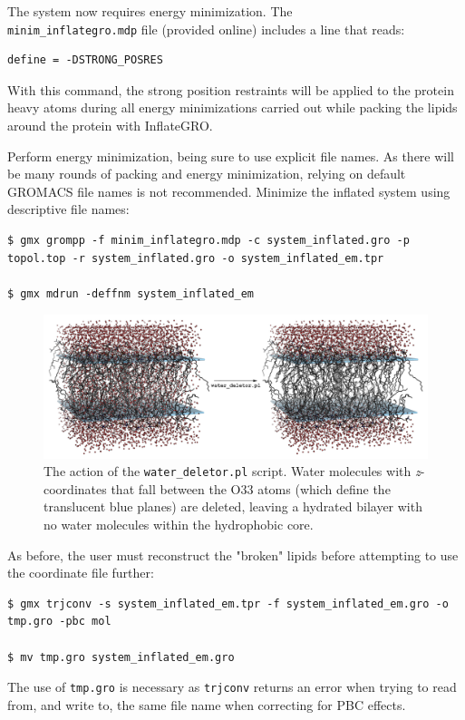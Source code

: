 \documentclass[9pt,tutorial,pubversion]{livecoms}
\begin{document}
The system now requires energy minimization. The\\ \texttt{minim\_inflategro.mdp} file (provided online) includes a line that reads:

\begin{lstlisting}
define = -DSTRONG_POSRES
\end{lstlisting}
%
With this command, the strong position restraints will be applied to the protein heavy atoms during all energy minimizations carried out while packing the lipids around the protein with InflateGRO.

Perform energy minimization, being sure to use explicit file names. As there will be many rounds of packing and energy minimization, relying on default GROMACS file names is not recommended. Minimize the inflated system using descriptive file names:

\begin{lstlisting}
$ gmx grompp -f minim_inflategro.mdp -c system_inflated.gro -p topol.top -r system_inflated.gro -o system_inflated_em.tpr

$ gmx mdrun -deffnm system_inflated_em
\end{lstlisting}

\begin{figure}[h!]
\centering
\includegraphics{kalp_dppc_water_deletor}
\caption{The action of the \texttt{water\_deletor.pl} script. Water molecules with {\em z}-coordinates that fall between the O33 atoms (which define the translucent blue planes) are deleted, leaving a hydrated bilayer with no water molecules within the hydrophobic core.}
\label{kalp_lipid_water_delete}
\end{figure}

As before, the user must reconstruct the "broken" lipids before attempting to use the coordinate file further:

\begin{lstlisting}
$ gmx trjconv -s system_inflated_em.tpr -f system_inflated_em.gro -o tmp.gro -pbc mol

$ mv tmp.gro system_inflated_em.gro
\end{lstlisting}
%
The use of \texttt{tmp.gro} is necessary as \texttt{trjconv} returns an error when trying to read from, and write to, the same file name when correcting for PBC effects.
\end{document}
